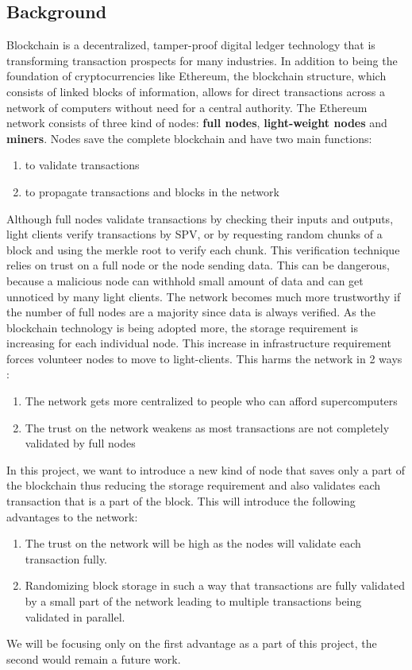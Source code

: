 \documentclass[conference]{IEEEtran}
\begin{document}
\subsection{Background}
    Blockchain is a decentralized, tamper-proof digital ledger technology that
    is transforming transaction prospects for many industries. In addition to
    being the foundation of cryptocurrencies like Ethereum, the blockchain
    structure, which consists of linked blocks of information, allows for direct
    transactions across a network of computers without need for a central
    authority. The Ethereum network consists of three kind of nodes:
    \textbf{full nodes}, \textbf{light-weight nodes } and \textbf{miners}. Nodes
    save the complete blockchain and have two main functions: 
    \begin{enumerate}
        \item to validate transactions
        \item to propagate transactions and blocks in the network
    \end{enumerate} 
    Although full nodes validate transactions by checking their inputs and
    outputs, light clients verify transactions by SPV, or by requesting random
    chunks of a block and using the merkle root to verify each chunk. This
    verification technique relies on trust on a full node or the node sending
    data. This can be dangerous, because a malicious node can withhold small
    amount of data and can get unnoticed by many light clients. The network
    becomes much more trustworthy if the number of full nodes are a majority
    since data is always verified. As the blockchain technology is being adopted
    more, the storage requirement is increasing for each individual node. This
    increase in infrastructure requirement forces volunteer nodes to move to
    light-clients. This harms the network in 2 ways :
    \begin{enumerate}
        \item The network gets more centralized to people who can afford
            supercomputers
        \item The trust on the network weakens as most transactions are not
            completely validated by full nodes
    \end{enumerate}
    In this project, we want to introduce a new kind of node that saves only a
    part of the blockchain thus reducing the storage requirement and also
    validates each transaction that is a part of the block. This will introduce
    the following advantages to the network:
    \begin{enumerate}
        \item The trust on the network will be high as the nodes will validate
            each transaction fully.
        \item Randomizing block storage in such a way that transactions are
            fully validated by a small part of the network leading to multiple
            transactions being validated in parallel.
    \end{enumerate}
    We will be focusing only on the first advantage as a part of this project,
    the second would remain a future work.
\end{document}
